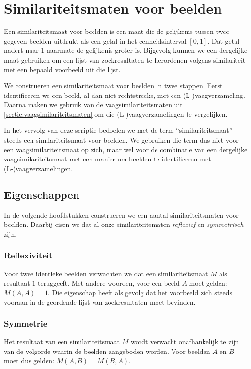 \chapter{Similariteitsmaten voor beelden}

Een similariteitsmaat voor beelden is een maat die de gelijkenis tussen twee gegeven
beelden uitdrukt als een getal in het eenheidsinterval $[0,1]$. Dat getal nadert naar 1
naarmate de gelijkenis groter is. Bijgevolg kunnen we een dergelijke maat gebruiken om
een lijst van zoekresultaten te herordenen volgens similariteit met een bepaald 
voorbeeld uit die lijst. 

We construeren een similariteitsmaat voor beelden in twee stappen. Eerst identificeren we
een beeld, al dan niet rechtstreeks, met een (L-)vaagverzameling. Daarna maken we gebruik van
de vaagsimilariteitsmaten uit \ref{sectie:vaagsimilariteitsmaten} om die (L-)vaagverzamelingen te
vergelijken. 

In het vervolg van deze scriptie bedoelen we met de term ``similariteitsmaat'' steeds
een similariteitsmaat voor beelden. We gebruiken die term dus niet voor een vaagsimilariteitsmaat
op zich, maar wel voor de combinatie van een dergelijke vaagsimilariteitsmaat met een manier om beelden te 
identificeren met (L-)vaagverzamelingen.

\section{Eigenschappen}

In de volgende hoofdstukken construeren we een aantal similariteitsmaten voor beelden. Daarbij 
eisen we dat al onze similariteitsmaten \emph{reflexief} en \emph{symmetrisch} zijn.

\subsection{Reflexiviteit}

Voor twee identieke beelden verwachten we dat een similariteitsmaat $M$ als resultaat $1$
teruggeeft. Met andere woorden, voor een beeld $A$ moet gelden: $M(A,A)=1$.
Die eigenschap heeft als gevolg dat het voorbeeld zich steeds vooraan in
de geordende lijst van zoekresultaten moet bevinden.

\subsection{Symmetrie}

Het resultaat van een similariteitsmaat $M$ wordt verwacht onafhankelijk te zijn van de 
volgorde waarin de beelden aangeboden worden. Voor beelden $A$ en $B$ moet dus gelden:
$M(A,B)=M(B,A)$.

